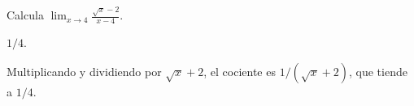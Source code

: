 
\begin{exercise}
Calcula $\displaystyle \lim_{x \to 4} \frac{\sqrt{x} - 2}{x - 4}$.


\begin{answer}
$1/4$.
\end{answer}

\begin{solution}
Multiplicando y dividiendo por $\sqrt{x} + 2$, el cociente es
$1/(\sqrt{x} + 2)$, que tiende a $1/4$.
\end{solution}
\end{exercise}
